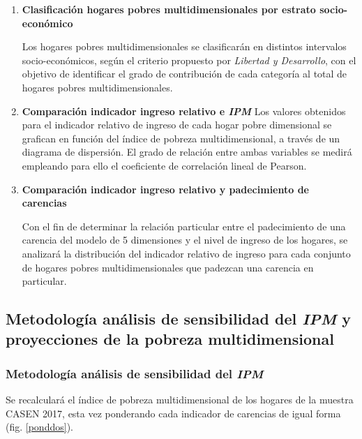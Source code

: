 \documentclass[12pt,letterpaper,spanish]{article}
\begin{document}
\begin{enumerate}
\vspace{2em}

\item \textbf{Clasificación hogares pobres multidimensionales por estrato socio-económico}

Los hogares pobres multidimensionales se clasificarán en distintos intervalos socio-económicos, según el criterio propuesto por \textit{Libertad y Desarrollo}, con el objetivo de identificar el grado de contribución de cada categoría al total de hogares pobres multidimensionales.

\vspace{2em}


\item \textbf{Comparación indicador ingreso relativo e \textit{IPM}}
Los valores obtenidos para el indicador relativo de ingreso de cada hogar pobre dimensional se grafican en función del índice de pobreza multidimensional, a través de un diagrama de dispersión. El grado de relación entre ambas variables se medirá empleando para ello el coeficiente de correlación lineal de Pearson. 

\vspace{2em}


\item \textbf{Comparación indicador ingreso relativo y padecimiento de carencias}

Con el fin de determinar la relación particular entre el padecimiento de una carencia del modelo de 5 dimensiones y el nivel de ingreso de los hogares, se analizará la distribución del indicador relativo de ingreso para cada conjunto de hogares pobres multidimensionales que padezcan una carencia en particular. 

\end{enumerate}




\newpage
\subsection{Metodología análisis de sensibilidad del \textit{IPM} y proyecciones de la pobreza multidimensional}


\subsubsection{Metodología análisis de sensibilidad del \textit{IPM}}


Se recalculará el índice de pobreza multidimensional de los hogares de la muestra CASEN 2017, esta vez ponderando cada indicador de carencias de igual forma (fig. \ref{ponddos}). 
\end{document}
